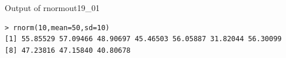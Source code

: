 \begin{Rscreen}{Output of rnorm}{out19_01}
	\begin{verbatim}
> rnorm(10,mean=50,sd=10)
[1] 55.85529 57.09466 48.90697 45.46503 56.05887 31.82044 56.30099 
[8] 47.23816 47.15840 40.80678
\end{verbatim}
\end{Rscreen}
